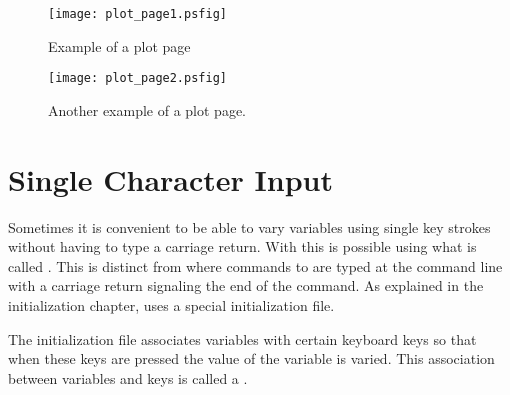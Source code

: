 \begin{figure}
  \centering
  \texttt{[image: plot\_page1.psfig]}
  \caption{Example of a plot page}
  \label{f:plot_page1}
\end{figure}

\begin{figure}
  \centering
  \texttt{[image: plot\_page2.psfig]}
  \caption{Another example of a plot page.}
  \label{f:plot_page2}
\end{figure}

\section{Single Character Input}

Sometimes it is convenient to be able to vary variables using single key strokes
without having to type a carriage return.
With \tao this is possible using what is called . This is distinct from
 where commands to \tao are typed at the command line with a carriage 
return signaling the end of the command. As explained in the initialization chapter,
 uses a special initialization file.

The  initialization file associates variables with certain keyboard keys
so that when these keys are pressed the value of the variable is varied. This association
between variables and keys is called a .

